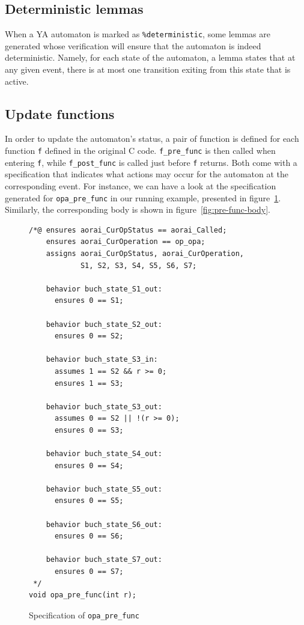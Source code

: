 \documentclass{frama-c-book}
\begin{document}
\subsection{Deterministic lemmas}
\lstset{language=ya}
When a YA automaton is marked as \lstinline|%deterministic|, some lemmas are
generated whose verification will ensure that the automaton is indeed
deterministic. Namely, for each state of the automaton, a lemma states that
at any given event, there is at most one transition exiting from this state
that is active.

\subsection{Update functions}

In order to update the automaton's status, a pair of function is defined for
each function \texttt{f} defined in the original C code. \texttt{f\_pre\_func}
is then called when entering \texttt{f}, while \texttt{f\_post\_func} is called
just before \texttt{f} returns. Both come with a specification that indicates
what actions may occur for the automaton at the corresponding event.
For instance, we can have a look at the specification generated for
\texttt{opa\_pre\_func} in our running example, presented in
figure~\ref{fig:pre-func}. Similarly, the corresponding body is shown in figure~\ref{fig:pre-func-body}.
\begin{figure}[htbp]
\begin{lstlisting}[style=c]
/*@ ensures aorai_CurOpStatus == aorai_Called;
    ensures aorai_CurOperation == op_opa;
    assigns aorai_CurOpStatus, aorai_CurOperation,
            S1, S2, S3, S4, S5, S6, S7;

    behavior buch_state_S1_out:
      ensures 0 == S1;

    behavior buch_state_S2_out:
      ensures 0 == S2;

    behavior buch_state_S3_in:
      assumes 1 == S2 && r >= 0;
      ensures 1 == S3;

    behavior buch_state_S3_out:
      assumes 0 == S2 || !(r >= 0);
      ensures 0 == S3;

    behavior buch_state_S4_out:
      ensures 0 == S4;

    behavior buch_state_S5_out:
      ensures 0 == S5;

    behavior buch_state_S6_out:
      ensures 0 == S6;

    behavior buch_state_S7_out:
      ensures 0 == S7;
 */
void opa_pre_func(int r);
\end{lstlisting}
\caption{Specification of \texttt{opa\_pre\_func}}\label{fig:pre-func}
\end{figure}
\end{document}
